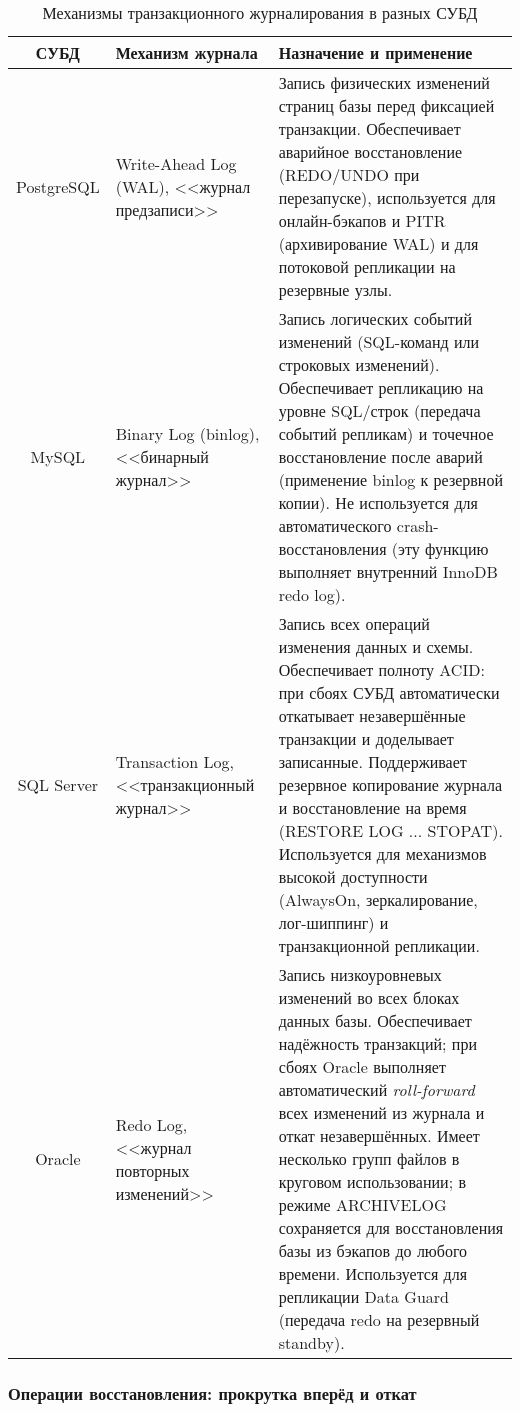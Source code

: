  \begin{table}[H]
    \centering
    \begin{tabular}{|c|p{4.25cm}|p{7.75cm}|}
        \hline
        \textbf{СУБД} & \textbf{Механизм журнала} & \textbf{Назначение и применение} \\
        \hline
        PostgreSQL & Write-Ahead Log (WAL), <<журнал предзаписи>> & Запись физических изменений страниц базы перед фиксацией транзакции. Обеспечивает аварийное восстановление (REDO/UNDO при перезапуске), используется для онлайн-бэкапов и PITR (архивирование WAL) и для потоковой репликации на резервные узлы. \autocite{PostgreSQLdocc28} \\
        \hline
        MySQL & Binary Log (binlog), <<бинарный журнал>> & Запись логических событий изменений (SQL-команд или строковых изменений). Обеспечивает репликацию на уровне SQL/строк (передача событий репликам) и точечное восстановление после аварий (применение binlog к резервной копии). Не используется для автоматического crash-восстановления (эту функцию выполняет внутренний InnoDB redo log). \autocite{Mysqldoc7} \\
        \hline
        SQL Server & Transaction Log, <<транзакционный журнал>> & Запись всех операций изменения данных и схемы. Обеспечивает полноту ACID: при сбоях СУБД автоматически откатывает незавершённые транзакции и доделывает записанные. Поддерживает резервное копирование журнала и восстановление на время (RESTORE LOG ... STOPAT). Используется для механизмов высокой доступности (AlwaysOn, зеркалирование, лог-шиппинг) и транзакционной репликации. \autocite{MicrosoftLearnSQLserverTransLog} \\
        \hline
        Oracle & Redo Log, <<журнал повторных изменений>> & Запись низкоуровневых изменений во всех блоках данных базы. Обеспечивает надёжность транзакций; при сбоях Oracle выполняет автоматический \textit{roll-forward} всех изменений из журнала и откат незавершённых. Имеет несколько групп файлов в круговом использовании; в режиме ARCHIVELOG сохраняется для восстановления базы из бэкапов до любого времени. Используется для репликации Data Guard (передача redo на резервный standby). \autocite{OracleRedoLog} \\
        \hline
    \end{tabular}
    \caption{Механизмы транзакционного журналирования в разных СУБД}
    \label{tab:txn_logging_mechanisms}
\end{table}

\subsubsection{Операции восстановления: прокрутка вперёд и откат} 
 
